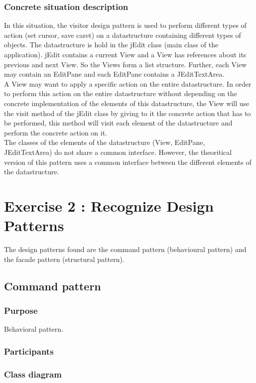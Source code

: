 \documentclass[a4paper,10pt]{article}
\begin{document}
\subsubsection{Concrete situation description}
In this situation, the visitor design pattern is used to perform different types of action (set cursor, save caret) on a datastructure containing different types of objects. The datastructure is hold in the jEdit class (main class of the application). jEdit contains a current View and a View has references about its previous and next View. So the Views form a list structure. Further, each View may contain an EditPane and each EditPane contains a JEditTextArea.\\
A View may want to apply a specific action on the entire datastructure. In order to perform this action on the entire datastructure without depending on the concrete implementation of the elements of this datastructure, the View will use the visit method of the jEdit class by giving to it the concrete action that has to be performed, this method will visit each element of the datastructure and perform the concrete action on it.\\
The classes of the elements of the datastructure (View, EditPane, JEditTextArea) do not share a common interface. However, the theoritical version of this pattern uses a common interface between the different elements of the datastructure.


\section{Exercise 2 : Recognize Design Patterns}
The design patterns found are the command pattern (behavioural pattern) and the facade pattern (structural pattern).

\subsection{Command pattern}
\subsubsection{Purpose}
Behavioral pattern.
\subsubsection{Participants}

\subsubsection{Class diagram}
\end{document}
